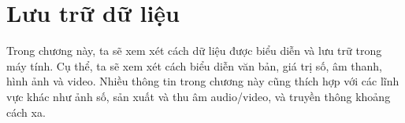 \chapter{Lưu trữ dữ liệu}
\label{chap:chuong1}
\minitoc 
\vspace{0.5cm}
\noindent
Trong chương này, ta sẽ xem xét cách dữ liệu được biểu diễn và lưu trữ trong máy tính.  Cụ
thể, ta sẽ xem xét cách biểu diễn văn bản, giá trị số, âm thanh, hình ảnh và video. Nhiều
thông tin trong chương này cũng thích hợp với các lĩnh vực khác như ảnh số, sản xuất và
thu âm audio/video, và truyền thông khoảng cách xa.

  
   



 